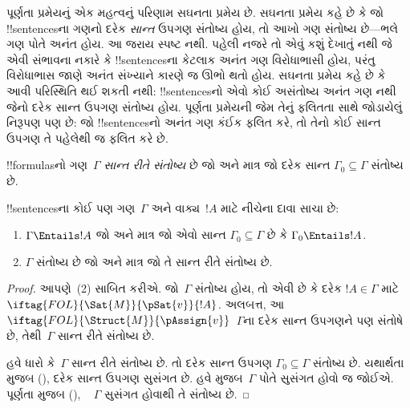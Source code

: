 \documentclass[../../../include/open-logic-section]{subfiles}
\begin{document}
      {}
      {}


પૂર્ણતા પ્રમેયનું એક મહત્વનું પરિણામ સઘનતા પ્રમેય છે. સઘનતા પ્રમેય
કહે છે કે જો !!{sentence}sના ગણનો દરેક \emph{સાન્ત} ઉપગણ સંતોષ્ય હોય,
તો આખો ગણ સંતોષ્ય છે—ભલે ગણ પોતે અનંત હોય. આ જરાય સ્પષ્ટ નથી. પહેલી
નજરે તો એવું કશું દેખાતું નથી જે એવી સંભાવના નકારે કે !!{sentence}sના
કેટલાક અનંત ગણ વિરોધાભાસી હોય, પરંતુ વિરોધાભાસ જાણે અનંત સંખ્યાને
કારણે જ ઊભો થતો હોય. સઘનતા પ્રમેય કહે છે કે આવી પરિસ્થિતિ થઈ શકતી
નથી: !!{sentence}sનો એવો કોઈ અસંતોષ્ય અનંત ગણ નથી જેનો દરેક સાન્ત ઉપગણ સંતોષ્ય
હોય. પૂર્ણતા પ્રમેયની જેમ તેનું ફલિતતા સાથે જોડાયેલું નિરૂપણ પણ છે:
જો !!{sentence}sનો અનંત ગણ કંઈક ફલિત કરે, તો તેનો કોઈ સાન્ત ઉપગણ તે
પહેલેથી જ ફલિત કરે છે.

\begin{defn}
  !!{formula}sનો ગણ~$\Gamma$ \emph{સાન્ત રીતે સંતોષ્ય} છે જો અને માત્ર
  જો દરેક સાન્ત $\Gamma_0\subseteq\Gamma$ સંતોષ્ય છે.
\end{defn}

\begin{thm}[સઘનતા પ્રમેય]
!!{sentence}sના કોઈ પણ ગણ~$\Gamma$ અને વાક્ય~$!A$ માટે નીચેના દાવા
સાચા છે:
\begin{enumerate}
  \item $\Gamma\Entails !A$ જો અને માત્ર જો એવો સાન્ત
    $\Gamma_0\subseteq\Gamma$ છે કે $\Gamma_0\Entails !A$.
  \item $\Gamma$ સંતોષ્ય છે જો અને માત્ર જો તે સાન્ત રીતે સંતોષ્ય છે.
\end{enumerate}
\end{thm}


\begin{proof}
આપણે~(2) સાબિત કરીએ. જો~$\Gamma$ સંતોષ્ય હોય, તો એવી
છે કે દરેક $!A\in\Gamma$ માટે
$\iftag{FOL}{\Sat{M}}{\pSat{v}}{!A}$. અલબત્ત, આ
$\iftag{FOL}{\Struct{M}}{\pAssign{v}}$~$\Gamma$ના દરેક સાન્ત ઉપગણને
પણ સંતોષે છે, તેથી~$\Gamma$ સાન્ત રીતે સંતોષ્ય છે.

હવે ધારો કે~$\Gamma$ સાન્ત રીતે સંતોષ્ય છે. તો દરેક સાન્ત ઉપગણ
$\Gamma_0\subseteq\Gamma$ સંતોષ્ય છે. યથાર્થતા મુજબ
(),
દરેક સાન્ત ઉપગણ સુસંગત છે. હવે
મુજબ~$\Gamma$ પોતે સુસંગત હોવો જ જોઈએ. પૂર્ણતા મુજબ
(), ~ $\Gamma$ સુસંગત હોવાથી તે સંતોષ્ય છે.
\end{proof}
\end{document}
